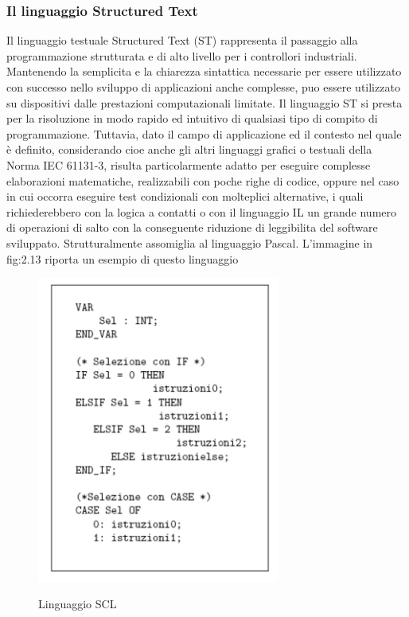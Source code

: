 \documentclass[12pt, a4paper, oneside]{book}
\begin{document}
\subsubsection{Il linguaggio Structured Text}
Il linguaggio testuale Structured Text (ST) rappresenta il passaggio alla programmazione strutturata e di alto livello per i controllori industriali. Mantenendo la semplicita e la chiarezza sintattica necessarie per essere utilizzato con successo nello sviluppo di applicazioni anche complesse, puo essere utilizzato su dispositivi dalle prestazioni computazionali limitate. Il linguaggio ST si presta per la risoluzione in modo rapido ed intuitivo di qualsiasi tipo di compito di programmazione. Tuttavia, dato il campo di applicazione ed il contesto nel quale è definito, considerando cioe anche gli altri linguaggi grafici o testuali della Norma IEC 61131-3, risulta particolarmente adatto per eseguire complesse elaborazioni matematiche, realizzabili con poche righe di codice, oppure nel caso in cui occorra eseguire test condizionali con molteplici alternative, i quali richiederebbero con la logica a contatti o con il linguaggio IL un grande numero di operazioni di salto con la conseguente riduzione di leggibilita del software sviluppato. Strutturalmente assomiglia al linguaggio Pascal. L’immagine in fig:2.13 riporta un esempio di questo linguaggio

	\begin{figure}[H]
	\centering
	\includegraphics[width=8cm]{Immagini/SCL}
	\label{scl}
	\caption{Linguaggio SCL}
\end{figure}
\end{document}
